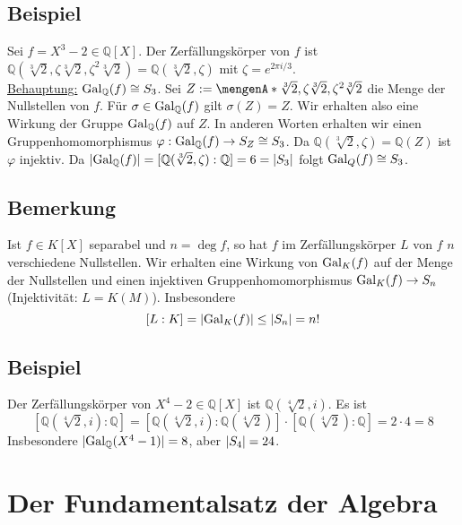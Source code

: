 \subsection[Beispiel einer Galois-Gruppe eines Polynoms]{Beispiel} %
\label{sub:1710}
Sei $f=X^3-2 \in \mathds{Q}[X]$. Der Zerfällungskörper von $f$ ist  $\mathds{Q}(\sqrt[3]{2}, \zeta \sqrt[3]{2}, \zeta^2 \sqrt[3]{2}) =\mathds{Q}(\sqrt[3]{2}, \zeta  )$ 
mit $\zeta= e^{2 \pi  i /3} $. \\
\uline{Behauptung:} $\operatorname{Gal}_{\mathbb{Q}}(f) \cong S_3$.
Sei $Z := \set{\sqrt[3]{2}, \zeta \sqrt[3]{2}, \zeta^2 \sqrt[3]{2} } $ die Menge der Nullstellen von $f$. Für $\sigma \in \operatorname{Gal}_{\mathbb{Q}}(f)$ gilt $\sigma(Z)=Z$. Wir 
erhalten also eine Wirkung der Gruppe $\operatorname{Gal}_{\mathbb{Q}}(f)$ auf $Z$. In anderen Worten erhalten wir einen Gruppenhomomorphismus 
$\varphi : \operatorname{Gal}_{\mathbb{Q}}(f) \to S_Z \cong S_3$. Da $\mathds{Q}(\sqrt[3]{2}, \zeta  ) = \mathds{Q}(Z)$ ist $\varphi$ injektiv. Da 
$\lvert\operatorname{Gal}_{\mathbb{Q}}(f)\rvert =  [\mathbb{Q}(\sqrt[3]{2}, \zeta  ): \mathbb{Q}]=6 = \lvert S_3\rvert $ folgt $\operatorname{Gal}_Q(f)  \cong S_3$. \bewende

\subsection[Bemerkung: Die Galois-Gruppe wirkt auf der Menge der Nullstellen]{Bemerkung} %
\label{sub:1711}
Ist $f \in K[X]$ separabel und $n= \deg f$, so hat $f$ im Zerfällungskörper $L$ von $f$ $n$ verschiedene Nullstellen. Wir erhalten eine Wirkung von $\operatorname{Gal}_K(f)$ auf der 
Menge der Nullstellen und einen injektiven Gruppenhomomorphismus $\operatorname{Gal}_K(f) \to S_n$ (Injektivität: $L=K(M)$). Insbesondere 
\[
	[L:K] = \lvert\operatorname{Gal}_K(f)\rvert \le \lvert S_n\rvert = n!  
\]

\subsection[Beispiel zur Ungleichung in \ref{sub:1711}]{Beispiel} %
\label{sub:1712}
Der Zerfällungskörper von $X^4-2 \in \mathds{Q}[X]$ ist $\mathds{Q}(\sqrt[4]{2},i)$. Es ist 
\[
	\left[\mathds{Q}(\sqrt[4]{2},i) :\mathds{Q}\right] = \left[\mathds{Q}(\sqrt[4]{2},i) : \mathds{Q}(\sqrt[4]{2})\right] \cdot \left[\mathds{Q}(\sqrt[4]{2}) : \mathds{Q}\right] = 2 \cdot 4 = 8
\]
Insbesondere $\lvert\operatorname{Gal}_{\mathbb{Q}}(X^4-1)\rvert = 8 $, aber $\lvert S_4\rvert = 24 $.
\newpage

\section{Der Fundamentalsatz der Algebra} %
\label{sec:18}

